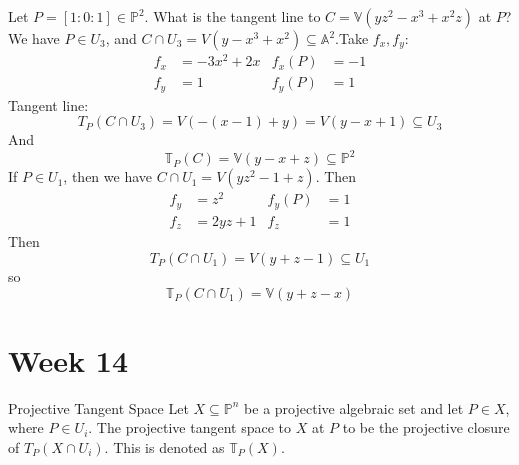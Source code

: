 \documentclass{report}
\begin{document}
\begin{examples}
    \begin{example}
        Let $P = [1 : 0 : 1] \in \mathbb{P}^{2}$. What is the tangent line to $C = \mathbb{V}(yz^{2} - x^{3} + x^{2}z)$ at $P$? We have $P \in U_{3}$, and $C \cap U_{3} = V(y - x^{3} + x^{2}) \subseteq \mathbb{A}^{2}$.Take $f_{x}, f_{y}$: 
            \begin{align*}
                f_{x} &= -3x^{2} + 2x & f_{x}(P) &= -1 \\
                f_{y} &= 1            & f_{y}(P) &= 1    
            \end{align*}
        Tangent line:
            \begin{equation*}
                T_{P}(C \cap U_{3}) = V(-(x - 1) + y) = V(y - x + 1) \subseteq U_{3}
            \end{equation*}
        And
            \begin{equation*}
                \mathbb{T}_{P}(C) = \mathbb{V}(y - x + z) \subseteq \mathbb{P}^{2}
            \end{equation*}
        If $P \in U_{1}$, then we have $C \cap U_{1} = V(yz^{2} - 1 + z)$. Then 
            \begin{align*}
                f_{y} &= z^{2}         & f_{y}(P) &= 1 \\
                f_{z} &= 2yz + 1       & f_{z}    &= 1   
            \end{align*}
        Then
            \begin{equation*}
                T_{P}(C \cap U_{1}) = V(y + z - 1) \subseteq U_{1}
            \end{equation*}
        so
            \begin{equation*}
                \mathbb{T}_{P}(C \cap U_{1}) = \mathbb{V}(y + z - x)
            \end{equation*}
    \end{example}
\end{examples}

\chapter{Week 14}

\begin{definition}{Projective Tangent Space}
    Let $X \subseteq \mathbb{P}^{n}$ be a projective algebraic set and let $P \in X$, where $P \in U_{i}$. The projective tangent space to $X$ at $P$ to be the projective closure of $T_{P}(X \cap U_{i})$. This is denoted as $\mathbb{T}_{P}(X)$.
\end{definition}
\end{document}
